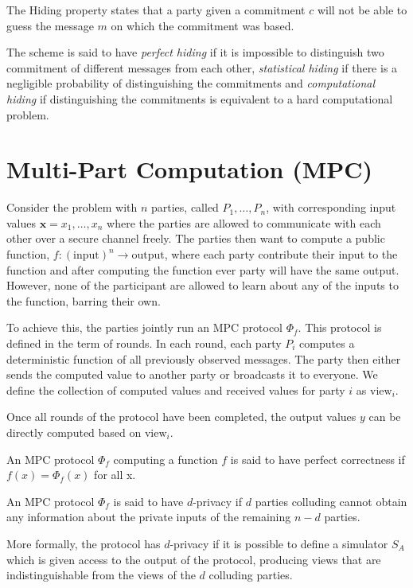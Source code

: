 \begin{definition}[hiding]
The Hiding property states that a party given a commitment $c$ will not be able
to guess the message $m$ on which the commitment was based.

The scheme is said to have \textit{perfect hiding} if it is impossible to
distinguish two commitment of different messages from each other,
\textit{statistical hiding} if there is a negligible probability of
distinguishing the commitments and \textit{computational hiding} if
distinguishing the commitments is equivalent to a hard computational problem.
\end{definition}


\section{Multi-Part Computation (MPC)}
\label{sec:background:mpc}
Consider the problem with $n$ parties, called $P_{1}, \dots, P_{n}$, with
corresponding input values $\textbf{x} = x_{1}, \dots, x_{n}$ where the parties
are allowed to communicate with each other over a secure channel freely.
The parties then want to compute a public function,
$f : (\text{input})^{n} \rightarrow \text{output}$, where each party contribute
their input to the function and after computing the function ever party will
have the same output. However, none of the participant are allowed to learn
about any of the inputs to the function, barring their own.

To achieve this, the parties jointly run an MPC protocol $\Phi_{f}$. This protocol
is defined in the term of rounds.
In each round, each party $P_{i}$ computes
a deterministic function of all previously observed messages.
The party then either sends the computed value to another party or broadcasts it to everyone.
We define the collection of computed values and received values for party $i$ as $\text{view}_{i}$.

Once all rounds of the protocol have been completed, the output values $y$ can be
directly computed based on $\text{view}_{i}$.



\begin{definition}[correctness]
  \label{def:mpc:correctness}
  An MPC protocol $\Phi_{f}$ computing a function $f$ is said to have perfect
  correctness if $f(x) = \Phi_{f}(x)$ for all x.
\end{definition}

\begin{definition}[d-Privacy]
\label{def:mpc:d-privacy}
  An MPC protocol $\Phi_{f}$ is said to have $d$-privacy if $d$ parties colluding
  cannot obtain any information about the private inputs of the remaining $n-d$ parties.

  More formally, the protocol has $d$-privacy if it is possible to define a
  simulator $S_{A}$ which is given access to the output of the protocol,
  producing views that are indistinguishable from the views of the $d$ colluding
  parties.
\end{definition}

